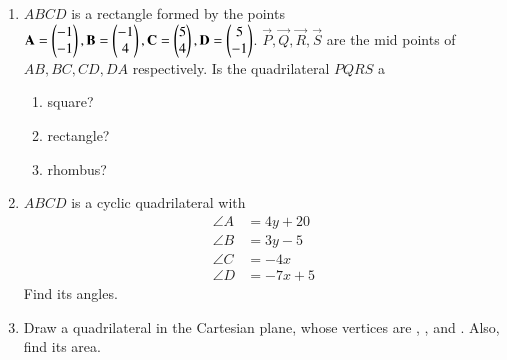 \renewcommand{\theequation}{\theenumi}
\begin{enumerate}[label=\arabic*.,ref=\thesubsection.\theenumi]

\item $ABCD$ is a rectangle formed by the points $\mathbf{A} = \begin{pmatrix}-1\\-1\end{pmatrix}, \mathbf{B} = \begin{pmatrix}-1\\4\end{pmatrix}, \mathbf{C} = \begin{pmatrix}5\\4\end{pmatrix}, \mathbf{D} = \begin{pmatrix}5\\-1\end{pmatrix}$. $ \vec{P}, \vec{Q}, \vec{R}, \vec{S}$ are the mid points of $AB, BC, CD, DA$ respectively.  Is the quadrilateral $PQRS$ a 
\begin{enumerate}
\item square?
\item rectangle?
\item rhombus?
\end{enumerate}
\item $ABCD$ is a cyclic quadrilateral with 
\begin{align}
\angle A &= 4y+20
\\
\angle B &= 3y-5
\\
\angle C &= -4x
\\
\angle D &= -7x+5
\end{align}
%
Find its angles.
\\
\solution

\item Draw a quadrilateral in the Cartesian plane, whose vertices are , ,  and . Also, find its area.
\\
\solution



\end{enumerate}
